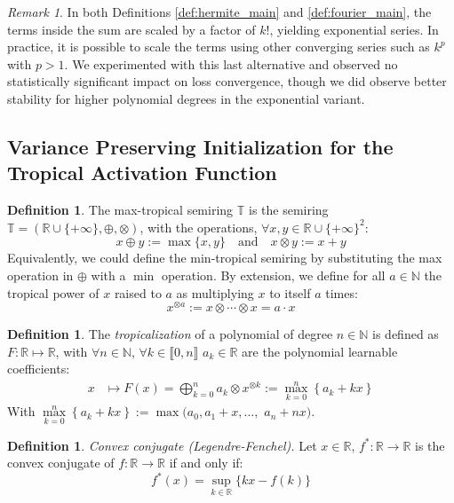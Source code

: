 \documentclass{article} %
\theoremstyle{plain}
\theoremstyle{definition}
\newtheorem{definition}[theorem]{Definition}
\theoremstyle{remark}
\newtheorem{remark}[theorem]{Remark}
\begin{document}
\begin{remark}
In both Definitions \ref{def:hermite_main} and \ref{def:fourier_main}, the terms inside the sum are scaled by a factor of $k!$, yielding exponential series. In practice, it is possible to scale the terms using other converging series such as $k^p$ with $p > 1$. We experimented with this last alternative and observed no statistically significant impact on loss convergence, though we did observe better stability for higher polynomial degrees in the exponential variant.
\end{remark}
\subsection{Variance Preserving Initialization for the Tropical Activation Function}
\begin{definition}
The max-tropical semiring  $\mathbb{T}$ is the semiring  $\mathbb{T}=(\mathbb{R} \cup\{+\infty\}, \oplus, \otimes)$, with the operations, $\forall x,y \in {\mathbb{R}\cup\{+\infty\}}^2$: 
\begin{equation}
x \oplus y:=\max \{x, y\} \quad\text{and}\quad x \otimes y:=x+y
\end{equation}
Equivalently, we could define the min-tropical semiring by substituting the max operation in $\oplus$ with a $\min$ operation.
By extension, we define for all $a \in \mathbb{N}$ the tropical power of $x$ raised to $a$ as multiplying $x$ to itself $a$ times:
\begin{equation}
x^{\otimes a}:=x \otimes \cdots \otimes x=a \cdot x
\end{equation}
\end{definition}
\begin{definition}
The \emph{tropicalization} of a polynomial of degree $n \in \mathbb{N}$ is defined as $F \colon \mathbb{R} \mapsto \mathbb{R}$, with $\forall n \in \mathbb{N}$, $\forall k \in \llbracket 0, n \rrbracket$ $a_k \in \mathbb{R}$ are the polynomial learnable coefficients:
    \begin{align}
    x &\mapsto  F(x) = \bigoplus_{k=0}^n a_k \otimes x^{\otimes k} := \max_{k=0}^{n} \left\{ a_k + kx \right\}
\end{align}
With $\max\limits_{k=0}^{n} \left\{ a_k + kx \right\}:= \max ( a_0, a_1 + x, \ldots,$ $ a_n + nx )$.
\end{definition}
\begin{definition} \emph{Convex conjugate (Legendre-Fenchel).} Let $x \in \mathbb{R}$, $f^* \colon \mathbb{R} \to \mathbb{R}$ is the convex conjugate of $f\colon \mathbb{R} \to \mathbb{R}$ if and only if: 
\begin{equation}
f^*(x) = \sup_{k \in \mathbb{R}} \{ kx - f(k)\} 
\end{equation}
\end{definition}
\end{document}
